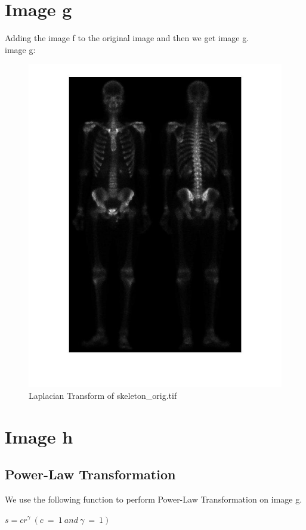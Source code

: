 \documentclass[11pt,oneside]{book}
\begin{document}
\section{Image g}
Adding the image f to the original image and then we get image g.\\
image g:
\begin{figure}[!htb]
   \centering  
   \includegraphics[width=1.0\textwidth]{images/2/g.jpg}
   \caption{Laplacian Transform of skeleton\_orig.tif}  
\end{figure}

\section{Image h}
\subsection{Power-Law Transformation}
We use the following function to perform Power-Law Transformation on image g.
\begin{center}
$s=cr^{\gamma}\ (c\ =\ 1\ and\ \gamma \ =\ 1)$
\end{center}
\end{document}
